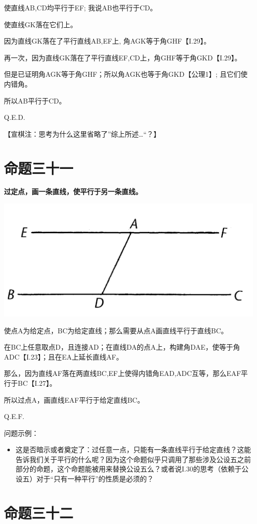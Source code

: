 \documentclass[
]{book}
\providecommand{\tightlist}{%
  \setlength{\itemsep}{0pt}\setlength{\parskip}{0pt}}
\begin{document}
使直线AB,CD均平行于EF; 我说AB也平行于CD。

使直线GK落在它们上。

因为直线GK落在了平行直线AB,EF上, 角AGK等于角GHF【I.29】。

再一次，因为直线GK落在了平行直线EF,CD上，角GHF等于角GKD【I.29】。

但是已证明角AGK等于角GHF；所以角AGK也等于角GKD【公理1】; 且它们使内错角。

所以AB平行于CD。

Q.E.D.

【宣棋注：思考为什么这里省略了''综上所述\ldots``？】

\hypertarget{ux547dux9898ux4e09ux5341ux4e00}{%
\section{命题三十一}\label{ux547dux9898ux4e09ux5341ux4e00}}

\textbf{过定点，画一条直线，使平行于另一条直线。}

\includegraphics[width=0.3\linewidth]{./image/img517}

使点A为给定点，BC为给定直线；那么需要从点A画直线平行于直线BC。

在BC上任意取点D，且连接AD；在直线DA的点A上，构建角DAE，使等于角ADC【I.23】；且在EA上延长直线AF。

那么，因为直线AF落在两直线BC,EF上使得内错角EAD,ADC互等，那么EAF平行于BC【I.27】。

所以过点A，画直线EAF平行于给定直线BC。

Q.E.F.

问题示例：

\begin{itemize}
\tightlist
\item
  这是否暗示或者奠定了：过任意一点，只能有一条直线平行于给定直线？这能告诉我们关于平行的什么呢？因为这个命题似乎只调用了那些涉及公设五之前部分的命题，这个命题能被用来替换公设五么？或者说I.30的思考（依赖于公设五）对于``只有一种平行''的性质是必须的？
\end{itemize}

\hypertarget{ux547dux9898ux4e09ux5341ux4e8c}{%
\section{命题三十二}\label{ux547dux9898ux4e09ux5341ux4e8c}}
\end{document}
